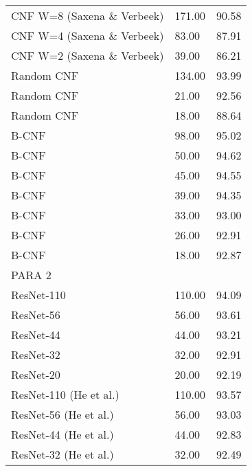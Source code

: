 \begin{table}[]
\begin{tabular}{|lll|}
CNF W=8 (Saxena \& Verbeek) & 171.00                      & 90.58       \\
CNF W=4 (Saxena \& Verbeek) & 83.00                       & 87.91       \\
CNF W=2 (Saxena \& Verbeek) & 39.00                       & 86.21       \\ \hline
Random CNF                  & 134.00                      & 93.99       \\
Random CNF                  & 21.00                       & 92.56       \\
Random CNF                  & 18.00                       & 88.64       \\ \hline
B-CNF                       & 98.00                       & 95.02       \\
B-CNF                       & 50.00                       & 94.62       \\
B-CNF                       & 45.00                       & 94.55       \\
B-CNF                       & 39.00                       & 94.35       \\
B-CNF                       & 33.00                       & 93.00       \\
B-CNF                       & 26.00                       & 92.91       \\
B-CNF                       & 18.00                       & 92.87       \\ \hline \hline
PARA 2                      &                             &             \\ \hline
ResNet-110                  & 110.00                      & 94.09       \\
ResNet-56                   & 56.00                       & 93.61       \\
ResNet-44                   & 44.00                       & 93.21       \\
ResNet-32                   & 32.00                       & 92.91       \\
ResNet-20                   & 20.00                       & 92.19       \\ \hline
ResNet-110 (He et al.)      & 110.00                      & 93.57       \\
ResNet-56 (He et al.)       & 56.00                       & 93.03       \\
ResNet-44 (He et al.)       & 44.00                       & 92.83       \\
ResNet-32 (He et al.)       & 32.00                       & 92.49       \\

\end{tabular}
\end{table}
